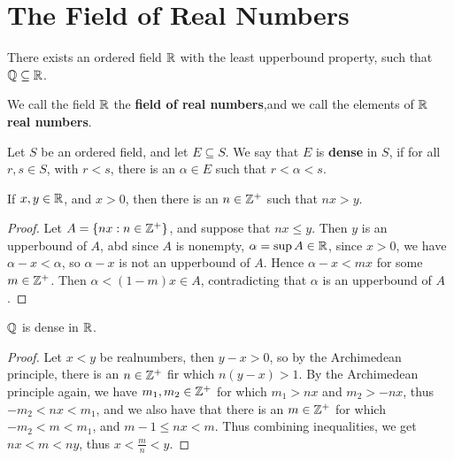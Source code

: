 
\section{The Field of Real Numbers}

\begin{theorem}\label{1.3.1}
    There exists an ordered field $\mathbb{R}$ with the least upperbound property, such that
     $\mathbb{Q} \subseteq \mathbb{R}$.
\end{theorem}

\begin{definition}
    We call the field $\mathbb{R}$ the \textbf{field of real numbers},and we call the elements
    of $\mathbb{R}$ \textbf{real numbers}.
\end{definition}

\begin{definition}
    Let $S$ be an ordered field, and let  $E \subseteq S$. We say that  $E$ is \textbf{dense}
    in $S$, if for all $r,s \in S$, with $r<s$, there is an $\alpha \in E$ such that
    $r<\alpha<s$.
\end{definition}

\begin{theorem}\label{1.3.2}
    If $x,y \in \mathbb{R}$, and  $x>0$, then there is an  $n \in \mathbb{Z}^+$ such that  $nx>y$.
\end{theorem}
\begin{proof}
    Let $A=\{nx: n \in \mathbb{Z}^+\}$, and suppose that  $nx \leq y$. Then  $y$ is an upperbound
    of $A$, abd since  $A$ is nonempty,  $\alpha=\sup{A} \in \mathbb{R}$, since $x>0$, we have
     $\alpha-x<\alpha$, so  $\alpha-x$ is not an upperbound of  $A$. Hence  $\alpha-x<mx$ for some
     $m \in \mathbb{Z}^+$. Then  $\alpha<(1-m)x \in A$, contradicting that  $\alpha$ is an upperbound
     of  $A$.
\end{proof}

\begin{theorem}\label{1.3.3}
    $\mathbb{Q}$ is dense in  $\mathbb{R}$.
\end{theorem}
\begin{proof}
    Let $x<y$ be realnumbers, then  $y-x>0$, so by the Archimedean principle, there is
    an $n \in \mathbb{Z}^+$ fir which $n(y-x)>1$. By the Archimedean principle again, we have
    $m_1,m_2 \in \mathbb{Z}^+$ for which $m_1>nx$ and $m_2>-nx$, thus $-m_2<nx<m_1$, and we also
    have that there is an $m \in \mathbb{Z}^+$ for which  $-m_2<m<m_1$, and $m-1 \leq nx<m$. Thus
    combining inequalities, we get  $nx<m<ny$, thus  $x<\frac{m}{n}<y$.
\end{proof}

